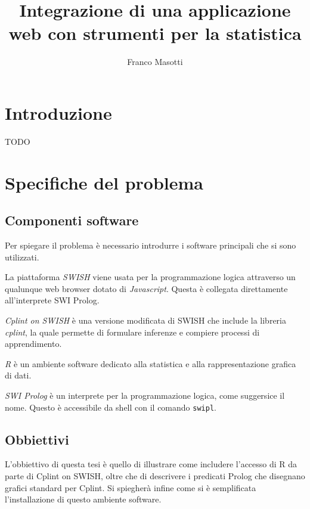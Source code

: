 \documentclass[10pt,titlepage,twoside,a4paper]{report}
\title{Integrazione di una applicazione web con strumenti per la statistica}
\author{Franco Masotti}
\begin{document}

\maketitle
\newpage
\tableofcontents
\newpage
\listoffigures
\newpage
\listoflistings
\cleardoublepage





\chapter{Introduzione} \label{introduzione}

TODO

\chapter{Specifiche del problema} \label{ch:specifiche-del-problema}
    \section{Componenti software}
Per spiegare il problema è necessario introdurre i software principali che si 
sono utilizzati.

La piattaforma \emph{SWISH}\cite{SWISH} viene usata per la programmazione 
logica attraverso un qualunque web browser dotato di \emph{Javascript}. Questa 
è collegata direttamente all'interprete SWI Prolog.

\emph{Cplint on SWISH} è una versione modificata di SWISH che include la 
libreria \emph{cplint}, la quale permette di formulare inferenze e 
compiere processi di apprendimento\cite{cplint}.

\emph{R} è un ambiente software dedicato alla statistica e 
alla rappresentazione grafica di dati\cite{r}.

\emph{SWI Prolog} è un interprete per la programmazione 
logica\cite{swiprolog}, come suggersice il nome\cite{prolog}.
Questo è accessibile da shell con il comando \texttt{swipl}.

    \section{Obbiettivi}
L'obbiettivo di questa tesi è quello di illustrare come includere l'accesso di 
R da parte di Cplint on SWISH, oltre che di descrivere i predicati Prolog che 
disegnano grafici standard per Cplint. Si spiegherà infine come si è 
semplificata l'installazione di questo ambiente software.
\end{document}
